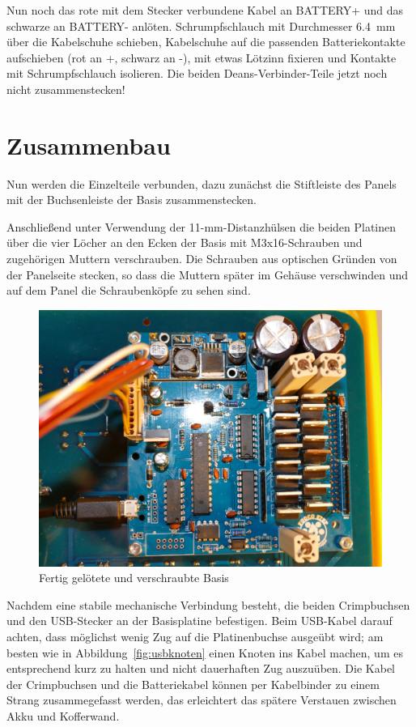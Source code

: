 \documentclass[paper=a4, open=any, numbers=noenddot]{scrbook}
\begin{document}
			Nun noch das rote mit dem Stecker verbundene Kabel an BATTERY+ und das schwarze an BATTERY- anlöten. Schrumpfschlauch mit Durchmesser \SI{6,4}{\milli\metre} über die Kabelschuhe schieben, Kabelschuhe auf die passenden Batteriekontakte aufschieben (rot an +, schwarz an -), mit etwas Lötzinn fixieren und Kontakte mit Schrumpfschlauch isolieren. Die beiden Deans-Verbinder-Teile jetzt noch nicht zusammenstecken!


		\section{Zusammenbau}
			Nun werden die Einzelteile verbunden, dazu zunächst die Stiftleiste des Panels mit der Buchsenleiste der Basis zusammenstecken.

			Anschließend unter Verwendung der 11-mm-Distanzhülsen die beiden Platinen über die vier Löcher an den Ecken der Basis mit M3x16-Schrauben und zugehörigen Muttern verschrauben. Die Schrauben aus optischen Gründen von der Panelseite stecken, so dass die Muttern später im Gehäuse verschwinden und auf dem Panel die Schraubenköpfe zu sehen sind.

			\begin{figure}
				\begin{center}
					\includegraphics[width=\textwidth]{base-eingebaut}
				\end{center}
				\caption{Fertig gelötete und verschraubte Basis}
				\label{fig:base-eingebaut}
			\end{figure}

			Nachdem eine stabile mechanische Verbindung besteht, die beiden Crimpbuchsen und den USB-Stecker an der Basisplatine befestigen. Beim USB-Kabel darauf achten, dass möglichst wenig Zug auf die Platinenbuchse ausgeübt wird; am besten wie in Abbildung~\ref{fig:usbknoten} einen Knoten ins Kabel machen, um es entsprechend kurz zu halten und nicht dauerhaften Zug auszuüben. Die Kabel der Crimpbuchsen und die Batteriekabel können per Kabelbinder zu einem Strang zusammegefasst werden, das erleichtert das spätere Verstauen zwischen Akku und Kofferwand.
			
\end{document}
